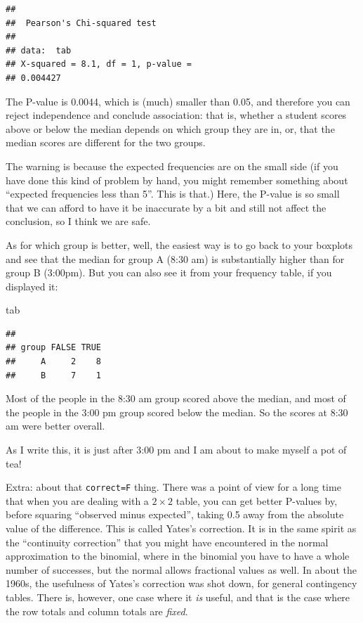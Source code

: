 \documentclass[]{tufte-book}
\newenvironment{Shaded}{}{}
\newcommand{\NormalTok}[1]{#1}
\theoremstyle{definition}
\theoremstyle{definition}
\theoremstyle{definition}
\theoremstyle{remark}
\begin{document}
\begin{verbatim}
## 
##  Pearson's Chi-squared test
## 
## data:  tab
## X-squared = 8.1, df = 1, p-value =
## 0.004427
\end{verbatim}

The P-value is 0.0044, which is (much) smaller than 0.05, and therefore
you can reject independence and conclude association: that is, whether a
student scores above or below the median depends on which group they are
in, or, that the median scores are different for the two groups.

The warning is because the expected frequencies are on the small side
(if you have done this kind of problem by hand, you might remember
something about ``expected frequencies less than 5''. This is that.)
Here, the P-value is so small that we can afford to have it be
inaccurate by a bit and still not affect the conclusion, so I think we
are safe.

As for which group is better, well, the easiest way is to go back to
your boxplots and see that the median for group A (8:30 am) is
substantially higher than for group B (3:00pm). But you can also see it
from your frequency table, if you displayed it:

\begin{Shaded}
\begin{Highlighting}[]
\NormalTok{tab}
\end{Highlighting}
\end{Shaded}

\begin{verbatim}
##      
## group FALSE TRUE
##     A     2    8
##     B     7    1
\end{verbatim}

Most of the people in the 8:30 am group scored above the median, and
most of the people in the 3:00 pm group scored below the median. So the
scores at 8:30 am were better overall.

As I write this, it is just after 3:00 pm and I am about to make myself
a pot of tea!

Extra: about that \texttt{correct=F} thing. There was a point of view
for a long time that when you are dealing with a \(2 \times 2\) table,
you can get better P-values by, before squaring ``observed minus
expected'', taking 0.5 away from the absolute value of the difference.
This is called Yates's correction. It is in the same spirit as the
``continuity correction'' that you might have encountered in the normal
approximation to the binomial, where in the binomial you have to have a
whole number of successes, but the normal allows fractional values as
well. In about the 1960s, the usefulness of Yates's correction was shot
down, for general contingency tables. There is, however, one case where
it \emph{is} useful, and that is the case where the row totals and
column totals are \emph{fixed}.
\end{document}

